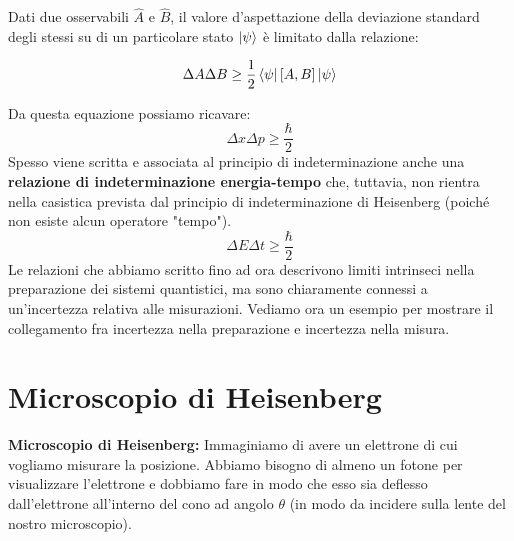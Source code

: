 \begin{definizione}
    Dati due osservabili $\hat A$ e $\hat B$, il valore d'aspettazione della deviazione standard degli stessi su di un particolare stato $\ket \psi$ è limitato dalla relazione:
    
    \begin{equation}
        \Delta A \Delta B \geq \frac{1}{2}\bra \psi \comm{A}{B} \ket \psi
    \end{equation}
\end{definizione}
\noindent Da questa equazione possiamo ricavare:
\begin{equation*}
    \Delta x \Delta p \geq \frac{\hbar}{2}
\end{equation*}
Spesso viene scritta e associata al principio di indeterminazione anche una \textbf{relazione di indeterminazione energia-tempo} che, tuttavia, non rientra nella casistica prevista dal principio di indeterminazione di Heisenberg (poiché non esiste alcun operatore "tempo").
\begin{equation*}
    \Delta E \Delta t \geq \frac{\hbar}{2}
\end{equation*}
Le relazioni che abbiamo scritto fino ad ora descrivono limiti intrinseci nella preparazione dei sistemi quantistici, ma sono chiaramente connessi a un'incertezza relativa alle misurazioni.
Vediamo ora un esempio per mostrare il collegamento fra incertezza nella preparazione e incertezza nella misura.

\section{Microscopio di Heisenberg}

\textbf{Microscopio di Heisenberg:}
Immaginiamo di avere un elettrone di cui vogliamo misurare la posizione. Abbiamo bisogno di almeno un fotone per visualizzare l'elettrone e dobbiamo fare in modo che esso sia deflesso dall'elettrone all'interno del cono ad angolo $\theta$ (in modo da incidere sulla lente del nostro microscopio).

